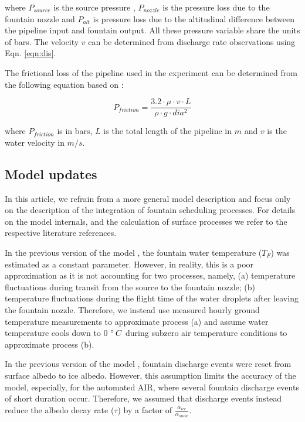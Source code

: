 \documentclass[tc, manuscript]{copernicus}
\begin{document}
where $P_{source}$ is the source pressure , $P_{nozzle}$ is the pressure loss due to the fountain nozzle and
$P_{alt}$ is pressure loss due to the altitudinal difference between the pipeline input and fountain output. All
these pressure variable share the units of bars.  The velocity $v$ can be determined from discharge rate
observations using Eqn. \ref{eqn:dis}. 

The frictional loss of the pipeline used in the experiment can be determined from the following equation based
on \cite{poiseuilleExperimentalInvestigationsFlow1847}:  

\begin{equation}
  \label{eqn:friction}
  P_{friction} = \frac{3.2 \cdot \mu \cdot v \cdot L}{\rho \cdot g \cdot dia^2}
\end{equation}

where $P_{friction}$ is in bars, $L$ is the total length of the pipeline in $m$ and $v$ is the 
water velocity in $m/s$.


\subsection{Model updates}

In this article, we refrain from a more general model description and focus only on the
description of the integration of fountain scheduling processes. For details on the model internals, and the
calculation of surface processes we refer to the respective literature references. 

In the previous version of the model \citep{balasubramanianInfluenceMeteorologicalConditions2022}, the fountain
water temperature ($T_F$) was estimated as a constant parameter. However, in reality, this is a poor
approximation as it is not accounting for two processes, namely, (a) temperature fluctuations during transit
from the source to the fountain nozzle; (b) temperature fluctuations during the flight time of the water
droplets after leaving the fountain nozzle. Therefore, we instead use measured hourly ground temperature
measurements to approximate process (a) and assume water temperature cools down to 0 $^{\circ}\,C$ during subzero
air temperature conditions to approximate process (b).

In the previous version of the model \citep{balasubramanianInfluenceMeteorologicalConditions2022}, fountain
discharge events were reset from surface albedo to ice albedo. However, this assumption limits the accuracy of
the model, especially, for the automated AIR, where several fountain discharge events of short duration occur.
Therefore, we assumed that discharge events instead reduce the albedo decay rate ($\tau$) by a 
factor of $\frac{\alpha_{ice}}{\alpha_{snow}}$.
\end{document}
